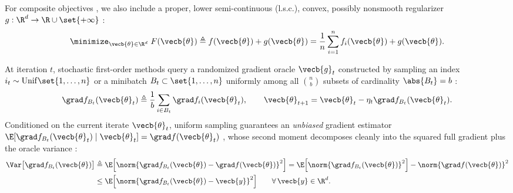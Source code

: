 \documentclass[../../../../master.tex]{subfiles}
\begin{document}
For composite objectives , we also include a proper, lower semi-continuous (l.s.c.), convex, possibly nonsmooth regularizer $g : \R^d \to \R \cup \set{+\infty}$ :
\begin{equation}
\label{eq:sgd:composite}
\minimize_{\vecb{\theta} \in \R^d}\; F(\vecb{\theta}) \triangleq f(\vecb{\theta}) + g(\vecb{\theta}) = \frac{1}{n}\sum_{i=1}^n f_i(\vecb{\theta}) + g(\vecb{\theta}).
\end{equation}

At iteration $t$, stochastic first-order methods query a randomized gradient oracle $\vecb{g}_t$ constructed by sampling an index $i_t \sim \mathrm{Unif}\set{1,\dots,n}$ or a minibatch $B_t \subset \set{1,\dots,n}$ uniformly among all $\binom{n}{b}$ subsets of cardinality $\abs{B_t} = b$ :
\begin{equation}
\label{eq:sgd:minibatch-oracle}
\grad f_{B_t}(\vecb{\theta}_t) \triangleq \frac{1}{b}\sum_{i \in B_t} \grad f_i(\vecb{\theta}_t), \qquad
\vecb{\theta}_{t+1} = \vecb{\theta}_t - \eta_t \grad f_{B_t}(\vecb{\theta}_t).
\end{equation}
Conditioned on the current iterate $\vecb{\theta}_t$, uniform sampling guarantees an \emph{unbiased} gradient estimator $\E[\grad f_{B_t}(\vecb{\theta}_t) \mid \vecb{\theta}_t] = \grad f(\vecb{\theta}_t)$ , whose second moment decomposes cleanly into the squared full gradient plus the oracle variance :
\begin{align}
\Var\bigl[\grad f_{B_t}(\vecb{\theta})\bigr]
&\triangleq \E\Bigl[\norm{\grad f_{B_t}(\vecb{\theta}) - \grad f(\vecb{\theta})}^2\Bigr]
= \E\Bigl[\norm{\grad f_{B_t}(\vecb{\theta})}^2\Bigr] - \norm{\grad f(\vecb{\theta})}^2 \nonumber \\
&\le \E\Bigl[\norm{\grad f_{B_t}(\vecb{\theta}) - \vecb{y}}^2\Bigr] \qquad \forall\, \vecb{y} \in \R^d. \label{eq:sgd:variance-decomp}
\end{align}
\end{document}
